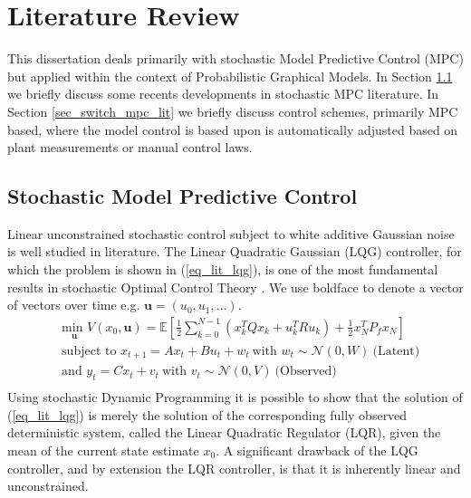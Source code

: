 \chapter{Literature Review}
\label{sec_lit_study}
This dissertation deals primarily with stochastic Model Predictive Control (MPC) but applied within the context of Probabilistic Graphical Models. In Section \ref{sec_stoch_mpc_lit} we briefly discuss some recents developments in stochastic MPC literature. In Section \ref{sec_switch_mpc_lit} we briefly discuss control schemes, primarily MPC based, where the model control is based upon is automatically adjusted based on plant measurements or manual control laws.

\section{Stochastic Model Predictive Control}
\label{sec_stoch_mpc_lit}
Linear unconstrained stochastic control subject to white additive Gaussian noise is well studied in literature. The Linear Quadratic Gaussian (LQG) controller, for which the problem is shown in (\ref{eq_lit_lqg}), is one of the most fundamental results in stochastic Optimal Control Theory \cite{lqg}. We use boldface to denote a vector of vectors over time e.g. $\mathbf{u}=(u_0, u_1,...)$.
\begin{equation}
\begin{aligned}
&\underset{\mathbf{u}}{\text{min }} V(x_0, \mathbf{u}) = \mathbb{E}\left[ \frac{1}{2}\sum_{k=0}^{N-1} \left( x_k^TQx_k + u_k^TRu_k \right) + \frac{1}{2}x_N^TP_fx_N \right] \\
& \text{subject to } x_{t+1}=Ax_t+Bu_t + w_t~\text{with } w_t \sim \mathcal{N}(0, W)~\text{(Latent)} \\
& \text{and } y_{t}= Cx_t + v_t ~\text{with } v_t \sim \mathcal{N}(0, V)~\text{(Observed)}\\
\end{aligned}
\label{eq_lit_lqg}
\end{equation}
Using stochastic Dynamic Programming it is possible to show that the solution of (\ref{eq_lit_lqg}) is merely the solution of the corresponding fully observed deterministic system, called the Linear Quadratic Regulator (LQR), given the mean of the current state estimate $x_0$. A significant drawback of the LQG controller, and by extension the LQR controller, is that it is inherently linear and unconstrained.

